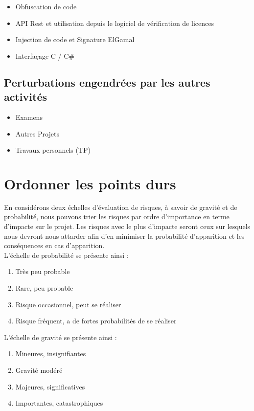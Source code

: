 \begin{itemize}
	\item Obfuscation de code
	\item API Rest et utilisation depuis le logiciel de vérification de licences
	\item Injection de code et Signature ElGamal
	\item Interfaçage C / C\#
\end{itemize}

\section{Perturbations engendrées par les autres activités}
\begin{itemize}
	\item Examens
	\item Autres Projets
	\item Travaux personnels (TP)
\end{itemize}

\chapter{Ordonner les points durs}

En considérons deux échelles d'évaluation de risques, à savoir de gravité et de probabilité, nous pouvons
trier les risques par ordre d'importance en terme d'impacte sur le projet. Les risques avec le plus d'impacte
seront ceux sur lesquels nous devront nous attarder afin d'en minimiser la probabilité d'apparition et les 
conséquences en cas d'apparition.\\

L'échelle de probabilité se présente ainsi :\\
\begin{enumerate}
	\item{Très peu probable}
	\item{Rare, peu probable}
	\item{Risque occasionnel, peut se réaliser}
	\item{Risque fréquent, a de fortes probabilités de se réaliser}
\end{enumerate}

\bigskip

L'échelle de gravité se présente ainsi :\\
\begin{enumerate}
	\item{Mineures, insignifiantes}
	\item{Gravité modéré}
	\item{Majeures, significatives}
	\item{Importantes, catastrophiques}
\end{enumerate}

